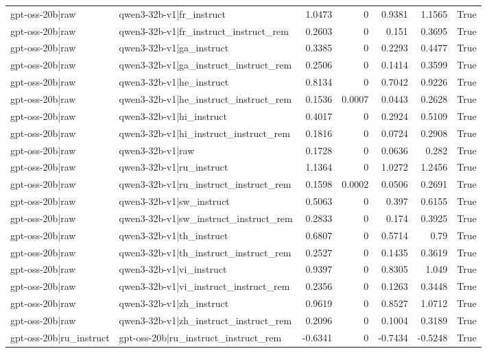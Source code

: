 \begin{table}
\begin{tabular}{l l r r r r l}
gpt-oss-20b|raw & qwen3-32b-v1|fr_instruct & 1.0473 & 0 & 0.9381 & 1.1565 & True \\
gpt-oss-20b|raw & qwen3-32b-v1|fr_instruct_instruct_rem & 0.2603 & 0 & 0.151 & 0.3695 & True \\
gpt-oss-20b|raw & qwen3-32b-v1|ga_instruct & 0.3385 & 0 & 0.2293 & 0.4477 & True \\
gpt-oss-20b|raw & qwen3-32b-v1|ga_instruct_instruct_rem & 0.2506 & 0 & 0.1414 & 0.3599 & True \\
gpt-oss-20b|raw & qwen3-32b-v1|he_instruct & 0.8134 & 0 & 0.7042 & 0.9226 & True \\
gpt-oss-20b|raw & qwen3-32b-v1|he_instruct_instruct_rem & 0.1536 & 0.0007 & 0.0443 & 0.2628 & True \\
gpt-oss-20b|raw & qwen3-32b-v1|hi_instruct & 0.4017 & 0 & 0.2924 & 0.5109 & True \\
gpt-oss-20b|raw & qwen3-32b-v1|hi_instruct_instruct_rem & 0.1816 & 0 & 0.0724 & 0.2908 & True \\
gpt-oss-20b|raw & qwen3-32b-v1|raw & 0.1728 & 0 & 0.0636 & 0.282 & True \\
gpt-oss-20b|raw & qwen3-32b-v1|ru_instruct & 1.1364 & 0 & 1.0272 & 1.2456 & True \\
gpt-oss-20b|raw & qwen3-32b-v1|ru_instruct_instruct_rem & 0.1598 & 0.0002 & 0.0506 & 0.2691 & True \\
gpt-oss-20b|raw & qwen3-32b-v1|sw_instruct & 0.5063 & 0 & 0.397 & 0.6155 & True \\
gpt-oss-20b|raw & qwen3-32b-v1|sw_instruct_instruct_rem & 0.2833 & 0 & 0.174 & 0.3925 & True \\
gpt-oss-20b|raw & qwen3-32b-v1|th_instruct & 0.6807 & 0 & 0.5714 & 0.79 & True \\
gpt-oss-20b|raw & qwen3-32b-v1|th_instruct_instruct_rem & 0.2527 & 0 & 0.1435 & 0.3619 & True \\
gpt-oss-20b|raw & qwen3-32b-v1|vi_instruct & 0.9397 & 0 & 0.8305 & 1.049 & True \\
gpt-oss-20b|raw & qwen3-32b-v1|vi_instruct_instruct_rem & 0.2356 & 0 & 0.1263 & 0.3448 & True \\
gpt-oss-20b|raw & qwen3-32b-v1|zh_instruct & 0.9619 & 0 & 0.8527 & 1.0712 & True \\
gpt-oss-20b|raw & qwen3-32b-v1|zh_instruct_instruct_rem & 0.2096 & 0 & 0.1004 & 0.3189 & True \\
gpt-oss-20b|ru_instruct & gpt-oss-20b|ru_instruct_instruct_rem & -0.6341 & 0 & -0.7434 & -0.5248 & True \\

\end{tabular}
\end{table}
